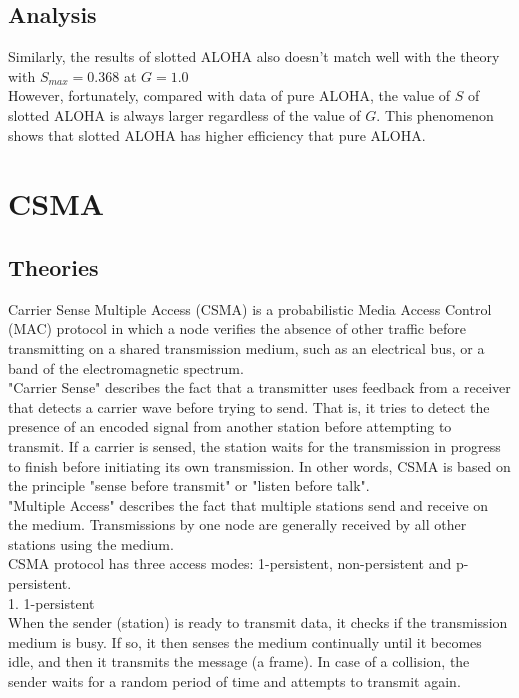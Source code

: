 \documentclass[11pt,a4paper]{report}
\begin{document}
\subsection*{Analysis}
Similarly, the results of slotted ALOHA also doesn't match well with the theory with \(S_{max} = 0.368\) at \(G = 1.0\) \\

However, fortunately, compared with data of pure ALOHA, the value of \(S\) of slotted ALOHA is always larger regardless of the value of \(G\). This phenomenon shows that slotted ALOHA has higher efficiency that pure ALOHA.



\section*{CSMA}
\subsection*{Theories}
Carrier Sense Multiple Access (CSMA) is a probabilistic Media Access Control (MAC) protocol in which a node verifies the absence of other traffic before transmitting on a shared transmission medium, such as an electrical bus, or a band of the electromagnetic spectrum. \\

"Carrier Sense" describes the fact that a transmitter uses feedback from a receiver that detects a carrier wave before trying to send. That is, it tries to detect the presence of an encoded signal from another station before attempting to transmit. If a carrier is sensed, the station waits for the transmission in progress to finish before initiating its own transmission. In other words, CSMA is based on the principle "sense before transmit" or "listen before talk". \\
"Multiple Access" describes the fact that multiple stations send and receive on the medium. Transmissions by one node are generally received by all other stations using the medium. \\

CSMA protocol has three access modes: 1-persistent, non-persistent and p-persistent.\\

1. 1-persistent \\
When the sender (station) is ready to transmit data, it checks if the transmission medium is busy. If so, it then senses the medium continually until it becomes idle, and then it transmits the message (a frame). In case of a collision, the sender waits for a random period of time and attempts to transmit again. \\
\end{document}
